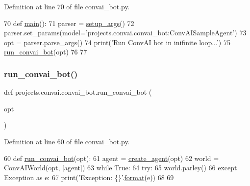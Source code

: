 Definition at line 70 of file convai\+\_\+bot.\+py.


\begin{DoxyCode}
70 \textcolor{keyword}{def }\hyperlink{namespaceprojects_1_1convai_1_1convai__bot_a20f231e61b1255f9d9a5de5e77f063bf}{main}():
71     parser = \hyperlink{namespaceprojects_1_1convai_1_1convai__bot_abb3f83d4277a55c3f972f0f77d9066a7}{setup\_args}()
72     parser.set\_params(model=\textcolor{stringliteral}{'projects.convai.convai\_bot:ConvAISampleAgent'})
73     opt = parser.parse\_args()
74     print(\textcolor{stringliteral}{'Run ConvAI bot in inifinite loop...'})
75     \hyperlink{namespaceprojects_1_1convai_1_1convai__bot_a370a74521f78bc526eb9264aeb289f65}{run\_convai\_bot}(opt)
76 
77 
\end{DoxyCode}
\mbox{\label{namespaceprojects_1_1convai_1_1convai__bot_a370a74521f78bc526eb9264aeb289f65}} 
\subsubsection{\texorpdfstring{run\+\_\+convai\+\_\+bot()}{run\_convai\_bot()}}
{\footnotesize\ttfamily def projects.\+convai.\+convai\+\_\+bot.\+run\+\_\+convai\+\_\+bot (\begin{DoxyParamCaption}\item[{}]{opt }\end{DoxyParamCaption})}



Definition at line 60 of file convai\+\_\+bot.\+py.


\begin{DoxyCode}
60 \textcolor{keyword}{def }\hyperlink{namespaceprojects_1_1convai_1_1convai__bot_a370a74521f78bc526eb9264aeb289f65}{run\_convai\_bot}(opt):
61     agent = \hyperlink{namespaceparlai_1_1core_1_1agents_a00d77a7e26fb89e8bd900f7b2a02982a}{create\_agent}(opt)
62     world = ConvAIWorld(opt, [agent])
63     \textcolor{keywordflow}{while} \textcolor{keyword}{True}:
64         \textcolor{keywordflow}{try}:
65             world.parley()
66         \textcolor{keywordflow}{except} Exception \textcolor{keyword}{as} e:
67             print(\textcolor{stringliteral}{'Exception: \{\}'}.\hyperlink{namespaceparlai_1_1chat__service_1_1services_1_1messenger_1_1shared__utils_a32e2e2022b824fbaf80c747160b52a76}{format}(e))
68 
69 
\end{DoxyCode}
\mbox{\label{namespaceprojects_1_1convai_1_1convai__bot_abb3f83d4277a55c3f972f0f77d9066a7}} 
